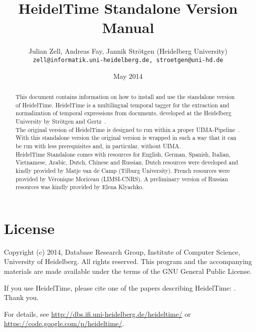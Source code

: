 \documentclass[
     11pt,         %
     a4paper,      %
     oneside,
     ]{article}
\newcommand{\languages}{English, German, Spanish, Italian, Vietnamese, Arabic, Dutch, Chinese and Russian}
\begin{document}
\title{%
HeidelTime Standalone Version\\
Manual
}
\author{Julian Zell, Andreas Fay, Jannik Str\"otgen (Heidelberg University)\\[0.2em]
\small \texttt{zell@informatik.uni-heidelberg.de, stroetgen@uni-hd.de}
}
\date{May 2014}
\maketitle

\begin{abstract}
This document contains information on how to install and use the standalone version of HeidelTime. HeidelTime is a multilingual temporal tagger for the extraction and normalization of temporal expressions from documents, developed at the Heidelberg University by Str\"otgen and Gertz~\cite{Strotgen2010, HeidelTime, StroetgenGertz2013}.\\
The original version of HeidelTime is designed to run within a proper UIMA-Pipeline~\cite{UIMA}. With this standalone version the original version is wrapped in such a way that it can be run with less prerequisites and, in particular, without UIMA.\\
HeidelTime Standalone comes with resources for \languages. Dutch resources were developed and kindly provided by Matje van de Camp (Tilburg University)\cite{Matje}. French resources were provided by Véronique Moriceau (LIMSI-CNRS)\cite{Veronique}. A preliminary version of Russian resources was kindly provided by Elena Klyachko\cite{Elena}.
\end{abstract}

\tableofcontents






\section{License}
Copyright (c) 2014, Database Research Group, Institute of Computer Science, University of Heidelberg. 
All rights reserved. This program and the accompanying materials 
are made available under the terms of the GNU General Public License.

If you use HeidelTime, please cite one of the papers describing HeidelTime: \cite{Strotgen2010, StroetgenGertz2013}. Thank you.

For details, see \url{http://dbs.ifi.uni-heidelberg.de/heideltime/} or \\
\url{https://code.google.com/p/heideltime/}.







\end{document}
